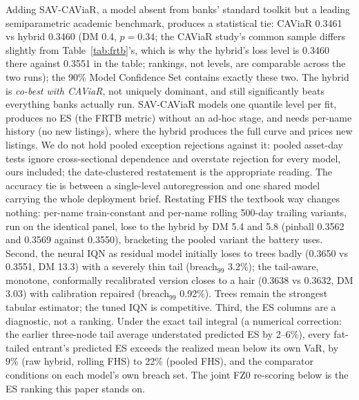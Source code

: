 \documentclass[11pt]{article}
\theoremstyle{remark}
\begin{document}
Adding SAV-CAViaR, a model
absent from banks' standard toolkit
but a leading semiparametric
academic benchmark, produces a statistical tie: CAViaR 0.3461 vs
hybrid 0.3460 (DM 0.4, $p=0.34$; the CAViaR study's common sample
differs slightly from Table~\ref{tab:frtb}'s, which is why the hybrid's
loss level is 0.3460 there against 0.3551 in the table; rankings, not
levels, are comparable across the two runs); the 90\% Model Confidence
Set contains exactly these two. The hybrid is \emph{co-best with CAViaR},
not uniquely dominant, and still significantly beats everything banks
actually run. SAV-CAViaR models one quantile level per fit, produces
no ES (the FRTB metric) without an ad-hoc stage, and needs per-name
history (no new listings), where the hybrid produces the full curve
and prices new listings. We do not
hold pooled exception rejections against it: pooled asset-day tests
ignore cross-sectional dependence and overstate rejection for every
model, ours included; the date-clustered restatement is the appropriate reading. The accuracy tie is between a
single-level autoregression and one shared model carrying the whole
deployment brief.
Restating FHS the textbook way changes nothing: per-name
train-constant and per-name rolling 500-day trailing variants, run on
the identical panel, lose to the hybrid by DM 5.4 and 5.8 (pinball
0.3562 and 0.3569 against 0.3550), bracketing the pooled variant the
battery uses. Second, the neural IQN as residual model initially loses
to trees badly (0.3650 vs 0.3551, DM 13.3) with a severely thin tail
(breach$_{99}$ 3.2\%); the tail-aware, monotone, conformally
recalibrated version closes to a hair (0.3638 vs 0.3632, DM 3.03) with
calibration repaired (breach$_{99}$ 0.92\%). Trees remain the strongest
tabular estimator; the tuned IQN is competitive.
Third, the ES columns are a diagnostic, not a ranking. Under the
exact tail integral (a numerical correction: the earlier three-node
tail average understated predicted ES by 2--6\%),
every fat-tailed entrant's predicted ES exceeds the realized mean
below its own VaR, by 9\% (raw hybrid, rolling FHS) to 22\% (pooled
FHS), and the comparator conditions on each model's own breach set.
The joint FZ0 re-scoring below is the ES ranking this paper stands
on.
\end{document}
